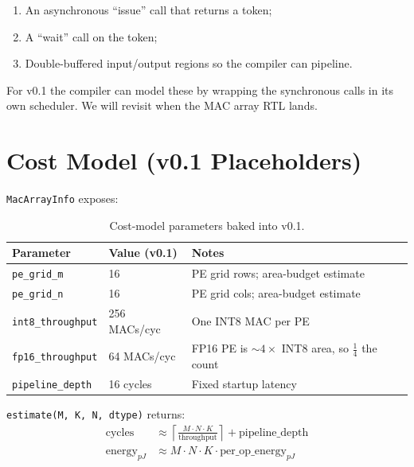 \documentclass[11pt]{article}
\begin{document}
\begin{enumerate}
\item An asynchronous ``issue'' call that returns a token;
\item A ``wait'' call on the token;
\item Double-buffered input/output regions so the compiler can pipeline.
\end{enumerate}

For v0.1 the compiler can model these by wrapping the synchronous
calls in its own scheduler. We will revisit when the MAC array RTL
lands.

\section{Cost Model (v0.1 Placeholders)}
\label{sec:cost}

\texttt{MacArrayInfo} exposes:

\begin{table}[ht]
\centering
\small
\caption{Cost-model parameters baked into v0.1.}
\label{tab:cost}
\begin{tabular}{@{}l l p{8cm}@{}}
\toprule
Parameter                & Value (v0.1) & Notes \\
\midrule
\texttt{pe\_grid\_m}     & 16           & PE grid rows; area-budget estimate \\
\texttt{pe\_grid\_n}     & 16           & PE grid cols; area-budget estimate \\
\texttt{int8\_throughput}& 256 MACs/cyc & One INT8 MAC per PE \\
\texttt{fp16\_throughput}& 64 MACs/cyc  & FP16 PE is $\sim$$4\times$ INT8 area, so $\frac{1}{4}$ the count \\
\texttt{pipeline\_depth} & 16 cycles    & Fixed startup latency \\
\bottomrule
\end{tabular}
\end{table}

\noindent
\texttt{estimate(M, K, N, dtype)} returns:
\begin{align*}
\text{cycles}     & \approx \left\lceil \frac{M \cdot N \cdot K}{\text{throughput}} \right\rceil + \text{pipeline\_depth} \\
\text{energy}_{pJ} & \approx M \cdot N \cdot K \cdot \text{per\_op\_energy}_{pJ}
\end{align*}
\end{document}
